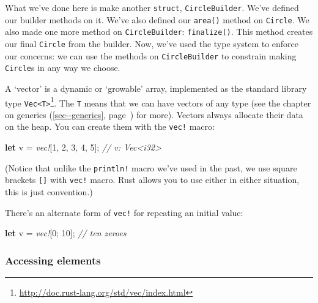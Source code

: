 \documentclass[a4paper,]{book}
\renewcommand*{\hyperref}[2][\ar]{%
  \def\ar{#2}%
  #2 (\autoref{#1}, page~\pageref{#1})}
\newenvironment{Shaded}{\begin{snugshade}}{\end{snugshade}}
\newcommand{\KeywordTok}[1]{\textcolor[rgb]{0.13,0.29,0.53}{\textbf{{#1}}}}
\newcommand{\DecValTok}[1]{\textcolor[rgb]{0.00,0.00,0.81}{{#1}}}
\newcommand{\CommentTok}[1]{\textcolor[rgb]{0.56,0.35,0.01}{\textit{{#1}}}}
\newcommand{\PreprocessorTok}[1]{\textcolor[rgb]{0.56,0.35,0.01}{\textit{{#1}}}}
\newcommand{\NormalTok}[1]{{#1}}
\renewcommand{\href}[2]{#2\footnote{\url{#1}}}
\begin{document}
What we've done here is make another \texttt{struct},
\texttt{CircleBuilder}. We've defined our builder methods on it. We've
also defined our \texttt{area()} method on \texttt{Circle}. We also made
one more method on \texttt{CircleBuilder}: \texttt{finalize()}. This
method creates our final \texttt{Circle} from the builder. Now, we've
used the type system to enforce our concerns: we can use the methods on
\texttt{CircleBuilder} to constrain making \texttt{Circle}s in any way
we choose.


A `vector' is a dynamic or `growable' array, implemented as the standard
library type
\href{http://doc.rust-lang.org/std/vec/index.html}{\texttt{Vec\textless{}T\textgreater{}}}.
The \texttt{T} means that we can have vectors of any type (see the
chapter on \hyperref[sec--generics]{generics} for more). Vectors always
allocate their data on the heap. You can create them with the
\texttt{vec!} macro:

\begin{Shaded}
\begin{Highlighting}[]
\KeywordTok{let} \NormalTok{v = }\PreprocessorTok{vec!}\NormalTok{[}\DecValTok{1}\NormalTok{, }\DecValTok{2}\NormalTok{, }\DecValTok{3}\NormalTok{, }\DecValTok{4}\NormalTok{, }\DecValTok{5}\NormalTok{]; }\CommentTok{// v: Vec<i32>}
\end{Highlighting}
\end{Shaded}

(Notice that unlike the \texttt{println!} macro we've used in the past,
we use square brackets \texttt{{[}{]}} with \texttt{vec!} macro. Rust
allows you to use either in either situation, this is just convention.)

There's an alternate form of \texttt{vec!} for repeating an initial
value:

\begin{Shaded}
\begin{Highlighting}[]
\KeywordTok{let} \NormalTok{v = }\PreprocessorTok{vec!}\NormalTok{[}\DecValTok{0}\NormalTok{; }\DecValTok{10}\NormalTok{]; }\CommentTok{// ten zeroes}
\end{Highlighting}
\end{Shaded}

\subsubsection{Accessing elements}\label{accessing-elements}
\end{document}
